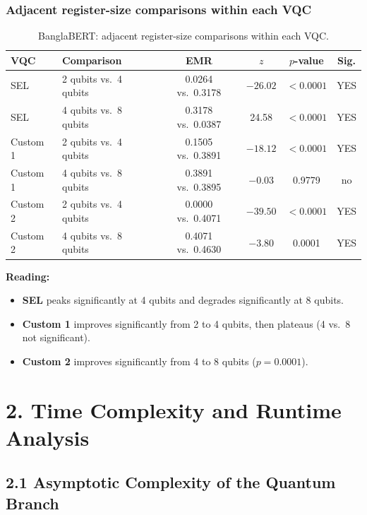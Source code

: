 \documentclass[11pt]{article}
\begin{document}
\subsubsection*{Adjacent register-size comparisons within each VQC}
\begin{table}[h!]
\centering
\small
\begin{threeparttable}
\begin{tabular}{llcccc}
\toprule
\textbf{VQC} & \textbf{Comparison} & \textbf{EMR} & $z$ & $p$-value & \textbf{Sig.} \\
\midrule
SEL     & 2 qubits vs.\ 4 qubits  & 0.0264 vs.\ 0.3178 & $-26.02$ & $<0.0001$ & YES \\
SEL     & 4 qubits vs.\ 8 qubits  & 0.3178 vs.\ 0.0387 & 24.58 & $<0.0001$ & YES \\
\addlinespace
Custom 1 & 2 qubits vs.\ 4 qubits & 0.1505 vs.\ 0.3891 & $-18.12$ & $<0.0001$ & YES \\
Custom 1 & 4 qubits vs.\ 8 qubits & 0.3891 vs.\ 0.3895 & $-0.03$ & 0.9779 & no \\
\addlinespace
Custom 2 & 2 qubits vs.\ 4 qubits & 0.0000 vs.\ 0.4071 & $-39.50$ & $<0.0001$ & YES \\
Custom 2 & 4 qubits vs.\ 8 qubits & 0.4071 vs.\ 0.4630 & $-3.80$ & 0.0001 & YES \\
\bottomrule
\end{tabular}
\end{threeparttable}
\caption{BanglaBERT: adjacent register-size comparisons within each VQC.}
\end{table}

\noindent\textbf{Reading:}
\begin{itemize}
    \item \textbf{SEL} peaks significantly at 4 qubits and degrades significantly at 8 qubits.
    \item \textbf{Custom 1} improves significantly from 2 to 4 qubits, then plateaus (4 vs.\ 8 not significant).
    \item \textbf{Custom 2} improves significantly from 4 to 8 qubits ($p=0.0001$).
\end{itemize}

\section*{2. Time Complexity and Runtime Analysis}

\subsection*{2.1 Asymptotic Complexity of the Quantum Branch}
\end{document}
